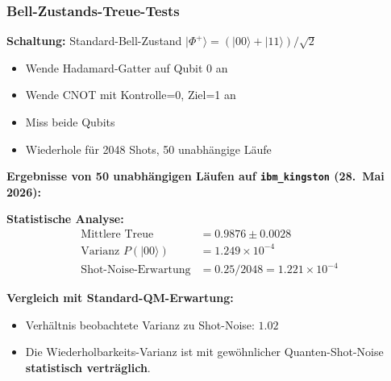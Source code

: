 \subsubsection{Bell-Zustands-Treue-Tests}

\begin{experimentbox}
	\textbf{Schaltung:} Standard-Bell-Zustand $|\Phi^+\rangle = (|00\rangle + |11\rangle)/\sqrt{2}$
	\begin{itemize}
		\item Wende Hadamard-Gatter auf Qubit 0 an
		\item Wende CNOT mit Kontrolle=0, Ziel=1 an
		\item Miss beide Qubits
		\item Wiederhole für 2048 Shots, 50 unabhängige Läufe
	\end{itemize}
\end{experimentbox}

\textbf{Ergebnisse von 50 unabhängigen Läufen auf \texttt{ibm\_kingston} (28.~Mai 2026):}

\begin{table}[h]
	\centering
	\caption{Bell-Zustands-Treue: Experimentelle Ergebnisse (50 Läufe)}
	\label{tab:bell_fidelity}
\end{table}

\textbf{Statistische Analyse:}
\begin{align}
	\text{Mittlere Treue} &= 0.9876 \pm 0.0028 \\
	\text{Varianz } P(|00\rangle) &= 1.249 \times 10^{-4} \\
	\text{Shot-Noise-Erwartung} &= 0.25/2048 = 1.221 \times 10^{-4}
\end{align}

\textbf{Vergleich mit Standard-QM-Erwartung:}
\begin{itemize}
	\item Verhältnis beobachtete Varianz zu Shot-Noise: $1.02$
	\item Die Wiederholbarkeits-Varianz ist mit gewöhnlicher Quanten-Shot-Noise \textbf{statistisch verträglich}.
\end{itemize}

